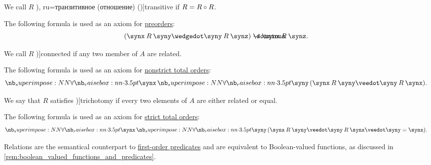 \begin{definition}
\begin{thmenum}[resume=def:binary_relation]
     We call \( R \) \term[bg=транзитивна (релация) (\cite[369]{ГеновМиховскиМоллов1991Алгебра}), ru=транзитивное (отношение) (\cite[def. 2.7]{Гуров2013ТеорияРешёток})]{transitive} if \( R = R \bincirc R \).

    The following formula is used as an axiom for \hyperref[def:partially_ordered_set]{preorders}:
    \begin{equation}\label{eq:def:binary_relation/transitive}
      (\synx \mathbin{R} \syny \synwedge \syny \mathbin{R} \synz) \synimplies \synx \mathbin{R} \synz.
    \end{equation}

     We call \( R \) \term[ru=полное (отношение) (\cite[def. 2.7]{Гуров2013ТеорияРешёток})]{connected} if any two member of \( A \) are related.

    The following formula is used as an axiom for \hyperref[def:totally_ordered_set]{nonstrict total orders}:
    \begin{equation}\label{eq:def:binary_relation/connected}
      \qforall \synx \qforall \syny (\synx \mathbin{R} \syny \synvee \syny \mathbin{R} \synx).
    \end{equation}

     We say that \( R \) satisfies \term[bg=трихотомия (\cite[11]{Тагамлицки1971ДиференциалноСмятане})]{trichotomy} if every two elements of \( A \) are either related or equal.

    The following formula is used as an axiom for \hyperref[def:totally_ordered_set]{strict total orders}:
    \begin{equation}\label{eq:def:binary_relation/trichotomy}
      \qforall \synx \qforall \syny (\synx \mathbin{R} \syny \synvee \syny \mathbin{R} \synx \synvee \syny = \synx).
    \end{equation}
  \end{thmenum}
\end{definition}
\begin{comments}
  \item Relations are the semantical counterpart to \hyperref[def:first_order_structure/interpretation/predicate]{first-order predicates} and are equivalent to Boolean-valued functions, as discussed in \cref{rem:boolean_valued_functions_and_predicates}.
\end{comments}

